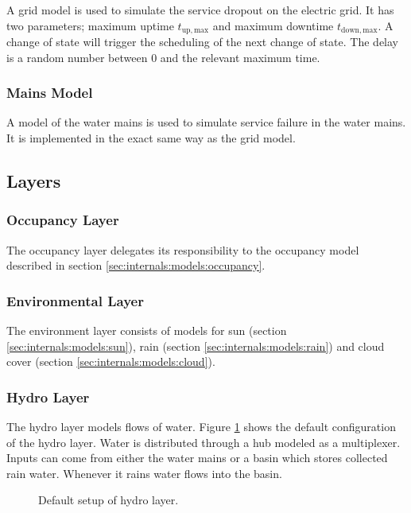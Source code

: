 \documentclass[10pt]{article}
\newcommand{\includeSVG}[1]{
  \texttt{[image: figs/\#1.pdf]}
}
\begin{document}
A grid model is used to simulate the service dropout on the electric grid. It has two parameters; maximum uptime $t_{\mathrm{up, max}}$ and maximum downtime $t_{\mathrm{down, max}}$. A change of state will trigger the scheduling of the next change of state. The delay is a random number between 0 and the relevant maximum time.

\subsubsection{Mains Model}
\label{sec:internals:models:mains}

A model of the water mains is used to simulate service failure in the water mains. It is implemented in the exact same way as the grid model.

\subsection{Layers}

\subsubsection{Occupancy Layer}

The occupancy layer delegates its responsibility to the occupancy model described in section \ref{sec:internals:models:occupancy}.

\subsubsection{Environmental Layer}

The environment layer consists of models for sun (section \ref{sec:internals:models:sun}), rain (section \ref{sec:internals:models:rain}) and cloud cover (section \ref{sec:internals:models:cloud}).

\subsubsection{Hydro Layer}

The hydro layer models flows of water. Figure \ref{fig:hydro} shows the default configuration of the hydro layer. Water is distributed through a hub modeled as a multiplexer. Inputs can come from either the water mains or a basin which stores collected rain water. Whenever it rains water flows into the basin.

\begin{figure}[htb]
  \begin{center}
    \rotatebox{0}{\scalebox{0.4}{\includeSVG{defaulthydro}}}
  \end{center}
  \caption{Default setup of hydro layer.}
  \label{fig:hydro}
\end{figure}
\end{document}

